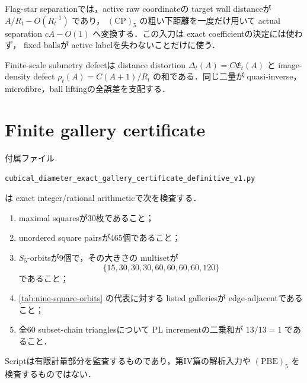 \documentclass[a4paper,11pt]{ltjsarticle}
\numberwithin{equation}{section}
\theoremstyle{plain}
\theoremstyle{definition}
\theoremstyle{remark}
\begin{document}
Flag-star separationでは，active raw coordinateの target wall distanceが $A/R_t-O(R_t^{-1})$ であり，
$\mathrm{(CP)}_5$ の粗い下距離を一度だけ用いて actual separation $cA-O(1)$ へ変換する．この入力は exact coefficientの決定には使わず，
fixed ballsが active labelを失わないことだけに使う．

Finite-scale submetry defectは distance distortion $\Delta_t(A)=C\mathfrak E_t(A)$ と image-density defect
$\rho_t(A)=C(A+1)/R_t$ の和である．同じ二量が quasi-inverse，microfibre，ball liftingの全誤差を支配する．

\section{Finite gallery certificate}\label{app:gallery-certificate}

付属ファイル
\begin{center}
\texttt{cubical\_diameter\_exact\_gallery\_certificate\_definitive\_v1.py}
\end{center}
は exact integer/rational arithmeticで次を検査する．
\begin{enumerate}
\item maximal squaresが30枚であること；
\item unordered square pairsが465個であること；
\item $S_5$-orbitsが9個で，その大きさの multisetが
\[
 \{15,30,30,30,60,60,60,60,120\}
\]
であること；
\item \cref{tab:nine-square-orbits} の代表に対する listed galleriesが edge-adjacentであること；
\item 全60 subset-chain trianglesについて PL incrementの二乗和が $13/13=1$ であること．
\end{enumerate}
Scriptは有限計量部分を監査するものであり，第IV篇の解析入力や $\mathrm{(PBE)}_5$ を検査するものではない．
\end{document}
